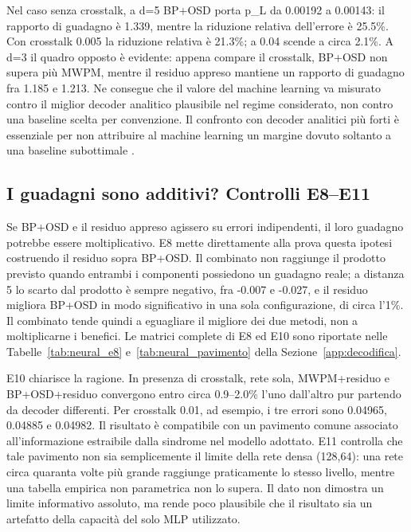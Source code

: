 Nel caso senza crosstalk, a d=5 BP+OSD porta p\_L da 0.00192 a 0.00143: il rapporto di guadagno è 1.339, mentre la riduzione relativa dell'errore è 25.5\%. Con crosstalk 0.005 la riduzione relativa è 21.3\%; a 0.04 scende a circa 2.1\%. A d=3 il quadro opposto è evidente: appena compare il crosstalk, BP+OSD non supera più MWPM, mentre il residuo appreso mantiene un rapporto di guadagno fra 1.185 e 1.213. Ne consegue che il valore del machine learning va misurato contro il miglior decoder analitico plausibile nel regime considerato, non contro una baseline scelta per convenzione. Il confronto con decoder analitici più forti è essenziale per non attribuire al machine learning un margine dovuto soltanto a una baseline subottimale \cite{roffe2020,panteleev2021}.

\subsection{I guadagni sono additivi? Controlli E8--E11}\label{sec:finale_5_3_6}

Se BP+OSD e il residuo appreso agissero su errori indipendenti, il loro guadagno potrebbe essere moltiplicativo. E8 mette direttamente alla prova questa ipotesi costruendo il residuo sopra BP+OSD. Il combinato non raggiunge il prodotto previsto quando entrambi i componenti possiedono un guadagno reale; a distanza 5 lo scarto dal prodotto è sempre negativo, fra -0.007 e -0.027, e il residuo migliora BP+OSD in modo significativo in una sola configurazione, di circa l'1\%. Il combinato tende quindi a eguagliare il migliore dei due metodi, non a moltiplicarne i benefici. Le matrici complete di E8 ed E10 sono riportate nelle Tabelle~\ref{tab:neural_e8} e~\ref{tab:neural_pavimento} della Sezione~\ref{app:decodifica}.

E10 chiarisce la ragione. In presenza di crosstalk, rete sola, MWPM+residuo e BP+OSD+residuo convergono entro circa 0.9--2.0\% l'uno dall'altro pur partendo da decoder differenti. Per crosstalk 0.01, ad esempio, i tre errori sono 0.04965, 0.04885 e 0.04982. Il risultato è compatibile con un pavimento comune associato all'informazione estraibile dalla sindrome nel modello adottato. E11 controlla che tale pavimento non sia semplicemente il limite della rete densa (128,64): una rete circa quaranta volte più grande raggiunge praticamente lo stesso livello, mentre una tabella empirica non parametrica non lo supera. Il dato non dimostra un limite informativo assoluto, ma rende poco plausibile che il risultato sia un artefatto della capacità del solo MLP utilizzato.

